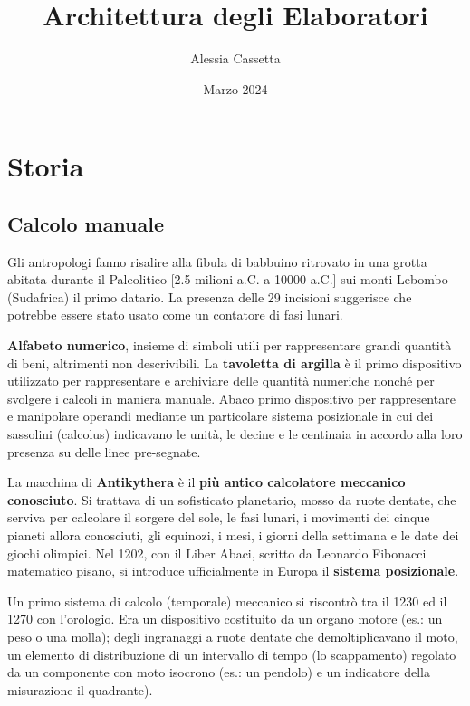 \documentclass[12pt]{article}
\title{\Huge{Architettura degli Elaboratori}}
\author{\large{Alessia Cassetta}}
\date{Marzo 2024}
\begin{document}
\maketitle

\newpage
\tableofcontents

\newpage
\section{Storia} \subsection{Calcolo manuale} Gli antropologi fanno risalire alla fibula di babbuino ritrovato in una grotta abitata durante il Paleolitico [2.5 milioni a.C. a 10000 a.C.] sui monti Lebombo (Sudafrica) il primo datario. La presenza delle 29 incisioni suggerisce che potrebbe essere stato usato come un contatore di fasi lunari.
\par\medskip\noindent
\textbf{Alfabeto numerico}, insieme di simboli utili per rappresentare grandi quantità di beni, altrimenti non descrivibili. La \textbf{tavoletta di argilla} è il primo dispositivo utilizzato per rappresentare e archiviare delle quantità numeriche nonché per svolgere i calcoli in maniera manuale.
Abaco primo dispositivo per rappresentare e manipolare operandi mediante un particolare sistema posizionale in cui dei sassolini (calcolus) indicavano le unità, le decine e le centinaia in accordo alla loro presenza su delle linee pre-segnate. \par\medskip\noindent
La macchina di \textbf{Antikythera} è il \textbf{più antico calcolatore meccanico conosciuto}.  Si trattava di un sofisticato planetario, mosso da ruote dentate, che serviva per calcolare il sorgere del sole, le fasi lunari, i movimenti dei cinque pianeti allora conosciuti, gli equinozi, i mesi, i giorni della settimana e le date dei giochi olimpici.
Nel 1202, con il Liber Abaci, scritto da Leonardo Fibonacci matematico pisano, si introduce ufficialmente in Europa il \textbf{sistema posizionale}. 
\par\medskip\noindent
Un primo sistema di calcolo (temporale) meccanico si riscontrò tra il 1230 ed il 1270 con l'orologio. Era un dispositivo costituito da un organo motore (es.: un peso o una molla); degli ingranaggi a ruote dentate che demoltiplicavano il moto, un elemento di distribuzione di un intervallo di tempo (lo scappamento) regolato da un componente con moto isocrono (es.: un pendolo) e un indicatore della misurazione il quadrante).
\par\medskip\noindent
\end{document}
